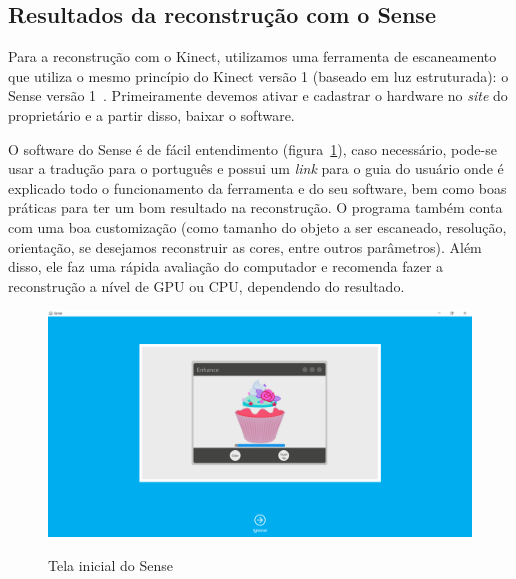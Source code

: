 \newpage

\subsection{Resultados da reconstrução com o Sense}
Para a reconstrução com o Kinect, utilizamos uma ferramenta de escaneamento que utiliza o mesmo princípio do Kinect versão 1 (baseado em luz estruturada): o Sense versão 1~\cite{3DSystems}.
Primeiramente devemos ativar e cadastrar o hardware no \emph{site} do proprietário e a partir disso, baixar o software.

O software do Sense é de fácil entendimento (figura~\ref{fig:sense0}), caso necessário, pode-se usar a tradução para o português e possui um \emph{link} para o guia do usuário onde é explicado todo o funcionamento da ferramenta e do seu software, bem como boas práticas para ter um bom resultado na reconstrução. O programa também conta com uma boa customização (como tamanho do objeto a ser escaneado, resolução, orientação, se desejamos reconstruir as cores, entre outros parâmetros). Além disso, ele faz uma rápida avaliação do computador e recomenda fazer a reconstrução a nível de GPU ou CPU, dependendo do resultado.

\begin{figure}[!h]
	\centering
	\caption{Tela inicial do Sense}
	\includegraphics[width=1\linewidth]{figs/sense2v2.png}
		\label{fig:sense0}
\end{figure} 

\newpage

